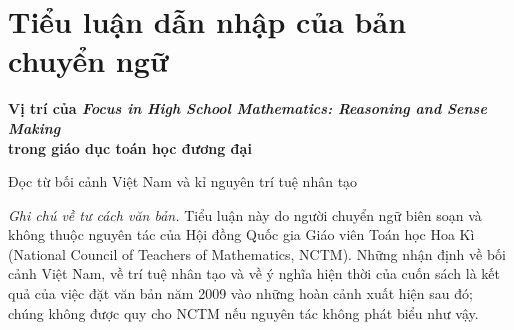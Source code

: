 
\cleardoublepage
\gdef\CurrentRunningHead{Tiểu luận dẫn nhập}

\chapter*{Tiểu luận dẫn nhập của bản chuyển ngữ}

\begin{center}
{\Large\bfseries
Vị trí của \emph{Focus in High School Mathematics: Reasoning and Sense Making}\\
trong giáo dục toán học đương đại}

\vspace{0.65\baselineskip}

{\large
Đọc từ bối cảnh Việt Nam và kỉ nguyên trí tuệ nhân tạo}
\end{center}

\vspace{0.8\baselineskip}

\noindent
\textit{Ghi chú về tư cách văn bản.}
Tiểu luận này do người chuyển ngữ biên soạn và không thuộc nguyên tác của
Hội đồng Quốc gia Giáo viên Toán học Hoa Kì (National Council of Teachers of
Mathematics, NCTM). Những nhận định về bối cảnh Việt Nam, về trí tuệ nhân tạo
và về ý nghĩa hiện thời của cuốn sách là kết quả của việc đặt văn bản năm 2009
vào những hoàn cảnh xuất hiện sau đó; chúng không được quy cho NCTM nếu nguyên
tác không phát biểu như vậy.

\vspace{0.6\baselineskip}

